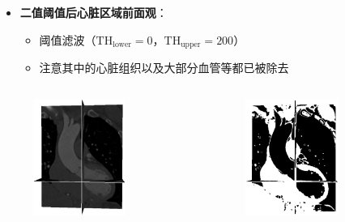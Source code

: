 
\begin{frame}
\begin{itemize}
  \item \textbf{二值阈值后心脏区域前面观}：
  \begin{itemize}
    \pause \item 阈值滤波（$\text{TH}_{\text{lower}} = 0$，$\text{TH}_{\text{upper}} = 200$）
    \pause \item 注意其中的心脏组织以及大部分血管等都已被除去
  \end{itemize}
\end{itemize}
\begin{columns}[b,onlytextwidth]
\begin{column}{.5\textwidth}
\pause \begin{figure}
\centering
\includegraphics[height=1.5in]{../../Figures/gac/heart/original.eps}
\end{figure}
\end{column}
\begin{column}{.5\textwidth}
\pause \begin{figure}
\centering
\includegraphics[height=1.5in]{../../Figures/gac/heart/binary_threshold.eps}
\end{figure}
\end{column}
\end{columns}
\end{frame}

